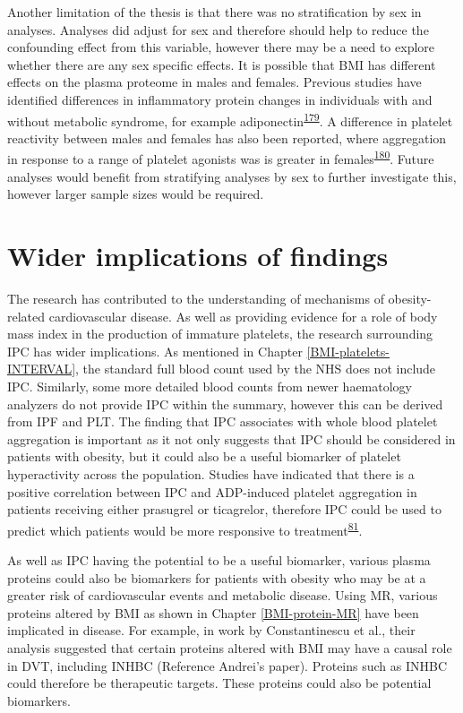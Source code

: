 \documentclass[11pt,twoside]{bristolthesis}
\begin{document}
Another limitation of the thesis is that there was no stratification by sex in analyses. Analyses did adjust for sex and therefore should help to reduce the confounding effect from this variable, however there may be a need to explore whether there are any sex specific effects. It is possible that BMI has different effects on the plasma proteome in males and females. Previous studies have identified differences in inflammatory protein changes in individuals with and without metabolic syndrome, for example adiponectin\textsuperscript{\protect\hyperlink{ref-TerHorst2020}{179}}. A difference in platelet reactivity between males and females has also been reported, where aggregation in response to a range of platelet agonists was is greater in females\textsuperscript{\protect\hyperlink{ref-Becker2006}{180}}. Future analyses would benefit from stratifying analyses by sex to further investigate this, however larger sample sizes would be required.

\hypertarget{wider-implications-of-findings}{%
\section{Wider implications of findings}\label{wider-implications-of-findings}}

The research has contributed to the understanding of mechanisms of obesity-related cardiovascular disease. As well as providing evidence for a role of body mass index in the production of immature platelets, the research surrounding IPC has wider implications. As mentioned in Chapter \ref{BMI-platelets-INTERVAL}, the standard full blood count used by the NHS does not include IPC. Similarly, some more detailed blood counts from newer haematology analyzers do not provide IPC within the summary, however this can be derived from IPF and PLT. The finding that IPC associates with whole blood platelet aggregation is important as it not only suggests that IPC should be considered in patients with obesity, but it could also be a useful biomarker of platelet hyperactivity across the population. Studies have indicated that there is a positive correlation between IPC and ADP-induced platelet aggregation in patients receiving either prasugrel or ticagrelor, therefore IPC could be used to predict which patients would be more responsive to treatment\textsuperscript{\protect\hyperlink{ref-Bernlochner2015a}{81}}.

As well as IPC having the potential to be a useful biomarker, various plasma proteins could also be biomarkers for patients with obesity who may be at a greater risk of cardiovascular events and metabolic disease. Using MR, various proteins altered by BMI as shown in Chapter \ref{BMI-protein-MR} have been implicated in disease. For example, in work by Constantinescu et al., their analysis suggested that certain proteins altered with BMI may have a causal role in DVT, including INHBC (Reference Andrei's paper). Proteins such as INHBC could therefore be therapeutic targets. These proteins could also be potential biomarkers.
\end{document}
